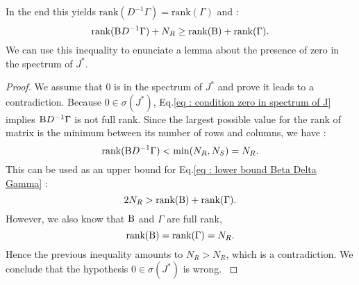 \documentclass[12pt, titlepage, twoside, openright]{report}
\begin{document}
In the end this yields $\text{rank}(D^{-1}\Gamma)=\text{rank}(\Gamma)$ and :
\begin{equation}
\text{rank}(\text{B} D^{-1}\Gamma) +N_R \geq \text{rank}(\text{B})+\text{rank}(\Gamma). \label{eq : lower bound Beta Delta Gamma}
\end{equation}
We can use this inequality to enunciate a lemma about the presence of zero in the spectrum of $J^*$.
\begin{proof}
{We assume that $0$ is in the spectrum of $J^*$ and prove it leads to a contradiction. Because $0 \in \sigma(J^*)$, Eq.\eqref{eq : condition zero in spectrum of J} implies $\text{B} D^{-1}\Gamma$ is not full rank. Since the largest possible value for the rank of matrix is the minimum between its number of rows and columns, we have :
\begin{equation}
\text{rank}(\text{B} D^{-1}\Gamma)< \min(N_R, N_S) = N_R.
\end{equation}
This can be used as an upper bound for Eq.\eqref{eq : lower bound Beta Delta Gamma} :
\begin{equation}
2 N_R > \text{rank}(\text{B})+\text{rank}(\Gamma).
\end{equation}
However, we also know that $\text{B}$ and $\Gamma$ are full rank, \ie
\begin{equation}
\text{rank}(\text{B})=\text{rank}(\Gamma)=N_R.
\end{equation}
Hence the previous inequality amounts to $N_R > N_R$, which is a contradiction. We conclude that the hypothesis $0 \in \sigma(J^*)$ is wrong.
}
\end{proof}

\normalfont
\end{document}
